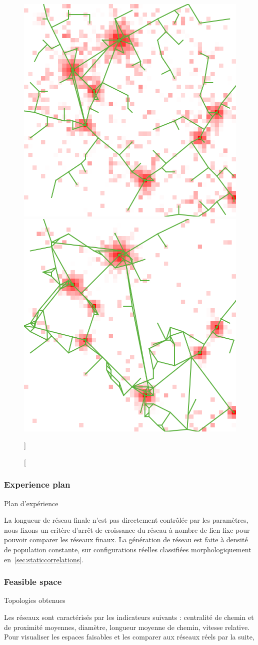 \begin{figure}
	\includegraphics[width=0.32\linewidth]{Figures/NetworkGrowth/example_nw-cost}
	\includegraphics[width=0.32\linewidth]{Figures/NetworkGrowth/example_nw-bio}
\caption[][]{\label{fig:networkgrowth:examples}}{\label{fig:networkgrowth:examples}}
\end{figure}




\subsubsection{Experience plan}{Plan d'expérience}



La longueur de réseau finale n'est pas directement contrôlée par les paramètres, nous fixons un critère d'arrêt de croissance du réseau à nombre de lien fixe pour pouvoir comparer les réseaux finaux. La génération de réseau est faite à densité de population constante, sur configurations réelles classifiées morphologiquement en~\ref{sec:staticcorrelations}. 


\subsubsection{Feasible space}{Topologies obtenues}

Les réseaux sont caractérisés par les indicateurs suivants : centralité de chemin et de proximité moyennes, diamètre, longueur moyenne de chemin, vitesse relative. Pour visualiser les espaces faisables et les comparer aux réseaux réels par la suite, 





